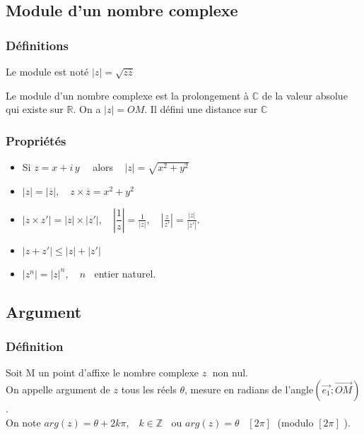 \documentclass[french]{yLectureNote}
\newcommand{\bz}{\overline{z}}
\begin{document}
\subsection{Module d'un nombre complexe}
\subsubsection{Définitions}


Le module est noté $|z| = \sqrt{z\bz}$

Le module d'un nombre complexe est la prolongement à $\mathbb{C}$ de la valeur absolue qui existe sur $\mathbb{R}$. On a $|z| = OM$. Il défini une distance sur $\mathbb{C}$
\subsubsection{Propriétés}
\begin{itemize}
\item Si $z=x+i\,y\quad $ alors $\;\;\;|z|=\sqrt{x^2+y^2}\;$
\item $|z|=\left|\overline{z}\right|,\quad z\times\overline{z}=x^2+y^2$
\item $\left|z\times z'\right|=|z|\times|z'|,\quad \left|\dfrac{1}{z}\right|=\frac{1}{|z|},\quad \left|\frac{z}{z'}\right|=\frac{|z|}{|z'|} $.
\item $|z+z'|\leq |z|+|z'|$
\item $\left| z^n\right|=|z|^n,\quad n\;\;$ entier naturel.
\end{itemize}


\subsection{Argument}
\subsubsection{Définition}
Soit M un point d'affixe le nombre complexe $z\;$ non nul.\\
On appelle argument de $z$ tous les réels $\theta$, mesure en radians de l'angle$ \left( \overrightarrow{e_1};\overrightarrow{OM}\right)$ .\\ On note $arg(z)=\theta +2k\pi,\;\;\; k \in \mathbb{Z}\;\;$ ou $arg(z)=\theta \;\;\;[2\pi]\;$ (modulo $[2\pi]$ ).
\end{document}
